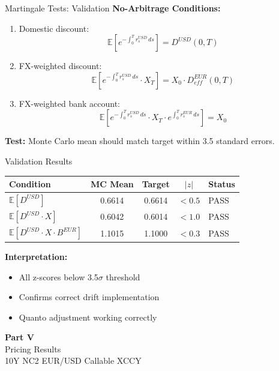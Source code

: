 \documentclass[aspectratio=169,11pt]{beamer}
\begin{document}
\begin{frame}{Martingale Tests: Validation}
\textbf{No-Arbitrage Conditions:}
\begin{enumerate}
    \item Domestic discount:
    \[
    \mathbb{E}[e^{-\int_0^T r_s^{USD}\,ds}] = D^{USD}(0,T)
    \]

    \item FX-weighted discount:
    \[
    \mathbb{E}[e^{-\int_0^T r_s^{USD}\,ds} \cdot X_T] = X_0 \cdot D^{EUR}_{eff}(0,T)
    \]

    \item FX-weighted bank account:
    \[
    \mathbb{E}[e^{-\int_0^T r_s^{USD}\,ds} \cdot X_T \cdot e^{\int_0^T r_s^{EUR}\,ds}] = X_0
    \]
\end{enumerate}

\textbf{Test:} Monte Carlo mean should match target within 3.5 standard errors.
\end{frame}

\begin{frame}{Validation Results}
\begin{center}
\begin{tabular}{lcccl}
\toprule
\textbf{Condition} & \textbf{MC Mean} & \textbf{Target} & $|z|$ & \textbf{Status}\\
\midrule
$\mathbb{E}[D^{USD}]$ & 0.6614 & 0.6614 & $<0.5$ & PASS \\
$\mathbb{E}[D^{USD} \cdot X]$ & 0.6042 & 0.6014 & $<1.0$ & PASS \\
$\mathbb{E}[D^{USD} \cdot X \cdot B^{EUR}]$ & 1.1015 & 1.1000 & $<0.3$ & PASS \\
\bottomrule
\end{tabular}
\end{center}

\textbf{Interpretation:}
\begin{itemize}
    \item All z-scores below 3.5$\sigma$ threshold
    \item Confirms correct drift implementation
    \item Quanto adjustment working correctly
\end{itemize}
\end{frame}


\begin{frame}{}
\begin{center}
\Huge\textbf{Part V}\\[1cm]
\Large Pricing Results\\[0.5cm]
\normalsize 10Y NC2 EUR/USD Callable XCCY
\end{center}
\end{frame}
\end{document}
